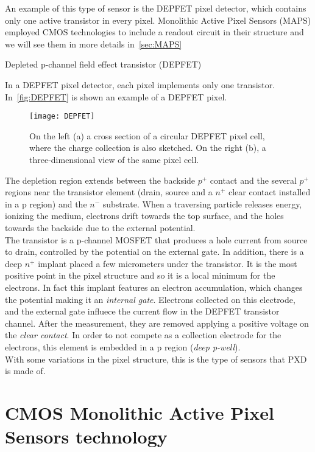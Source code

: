 An example of this type of sensor is the DEPFET pixel detector, which contains only one active transistor in every pixel. Monolithic Active Pixel Sensors (MAPS) employed CMOS technologies to include a readout circuit in their structure and we will see them in more details in~\autoref{sec:MAPS}

\begin{description}
\item[Depleted p-channel field effect transistor (DEPFET)]
\end{description}

In a DEPFET pixel detector, each pixel implements only one transistor. In~\autoref{fig:DEPFET} is shown an example of a DEPFET pixel.

\begin{figure}[h!]
\centering
\texttt{[image: DEPFET]}
\caption{On the left (a) a cross section of a circular DEPFET pixel cell, where the charge collection is also sketched. On the right (b), a three-dimensional view of the same pixel cell.}
\label{fig:DEPFET}
\end{figure}

The depletion region extends between the backside $p^{+}$ contact and the several $p^{+}$ regions near the transistor element (drain, source and a $n^{+}$ clear contact installed in a p region) and the $n^{-}$ substrate. When a traversing particle releases energy, ionizing the medium, electrons drift towards the top surface, and the holes towards the backside due to the external potential.\\
The transistor is a p-channel MOSFET that produces a hole current from source to drain, controlled by the potential on the external gate. In addition, there is a deep $n^{+}$ implant placed a few micrometers under the transistor. It is the most positive point in the pixel structure and so it is a local minimum for the electrons. In fact this implant features an electron accumulation, which changes the potential making it an \textit{internal gate}. 
Electrons collected on this electrode, and the external gate influece the current flow in the DEPFET transistor channel. After the measurement, they are removed applying a positive voltage on the \textit{clear contact}. In order to not compete as a collection electrode for the electrons, this element is embedded in a p region (\textit{deep p-well}).\\
With some variations in the pixel structure, this is the type of sensors that PXD is made of.


\section{CMOS Monolithic Active Pixel Sensors technology} \label{sec:MAPS}
 
